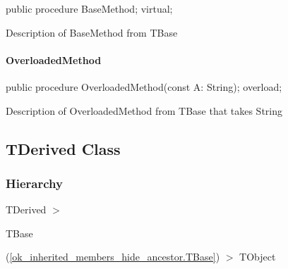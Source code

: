 \documentclass{report}
\begin{document}
\begin{list}{}{
\setlength{\itemindent}{0cm}
\setlength{\listparindent}{0cm}
\setlength{\leftmargin}{\evensidemargin}
\addtolength{\leftmargin}{\tmplength}
\settowidth{\labelsep}{X}
\addtolength{\leftmargin}{\labelsep}
\setlength{\labelwidth}{\tmplength}
}
\begin{flushleft}
\item[\textbf{Declaration}\hfill]
\begin{ttfamily}
public procedure BaseMethod; virtual;\end{ttfamily}


\end{flushleft}
\par
\item[\textbf{Description}]
Description of BaseMethod from TBase

\end{list}
\paragraph*{OverloadedMethod}\hspace*{\fill}

\begin{list}{}{
\setlength{\itemindent}{0cm}
\setlength{\listparindent}{0cm}
\setlength{\leftmargin}{\evensidemargin}
\addtolength{\leftmargin}{\tmplength}
\settowidth{\labelsep}{X}
\addtolength{\leftmargin}{\labelsep}
\setlength{\labelwidth}{\tmplength}
}
\begin{flushleft}
\item[\textbf{Declaration}\hfill]
\begin{ttfamily}
public procedure OverloadedMethod(const A: String); overload;\end{ttfamily}


\end{flushleft}
\par
\item[\textbf{Description}]
Description of OverloadedMethod from TBase that takes String

\end{list}
\subsection*{TDerived Class}
\subsubsection*{\large{\textbf{Hierarchy}}\normalsize\hspace{1ex}\hfill}
TDerived {$>$} \begin{ttfamily}TBase\end{ttfamily}(\ref{ok_inherited_members_hide_ancestor.TBase}) {$>$} 
TObject
\end{document}

